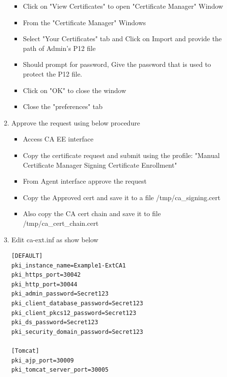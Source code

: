 \documentclass[a4paper]{article}
\begin{document}
\begin{enumerate}[label*=\arabic*.]
\begin{enumerate}[label*=\arabic*.]
\begin{itemize}
                            \item Click on "View Certificates" to open "Certificate Manager" Window
                            \item From the "Certificate Manager" Windows 
                            \item Select "Your Certificates" tab and Click on Import and provide the path
                                of Admin's P12 file 
                            \item Should prompt for password, Give the password that is used to protect the P12 file.
                            \item Click on "OK" to close the window
                            \item Close the "preferences" tab
                        \end{itemize}
                    \item Approve the request using below procedure
                        \begin{itemize}
                            \item Access CA EE interface
                            \item Copy the certificate request and submit using the profile:
                                    "Manual Certificate Manager Signing Certificate Enrollment"
                            \item From Agent interface approve the request
                            \item Copy the Approved cert and save it to a file /tmp/ca\_signing.cert
                            \item Also copy the CA cert chain and save it to file /tmp/ca\_cert\_chain.cert
                        \end{itemize}
                    \item Edit ca-ext.inf as show below
                        \begin{lstlisting}[style=configFile]
[DEFAULT]
pki_instance_name=Example1-ExtCA1
pki_https_port=30042
pki_http_port=30044
pki_admin_password=Secret123
pki_client_database_password=Secret123
pki_client_pkcs12_password=Secret123
pki_ds_password=Secret123
pki_security_domain_password=Secret123

[Tomcat]
pki_ajp_port=30009
pki_tomcat_server_port=30005



\end{lstlisting}
\end{enumerate}
\end{enumerate}
\end{document}
